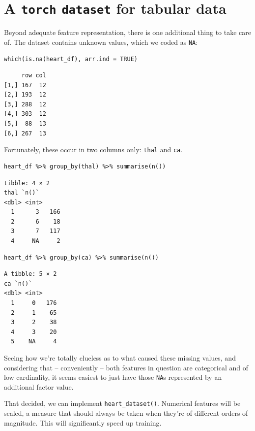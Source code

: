 \documentclass[
  letterpaper,
]{krantz}
\begin{document}
\hypertarget{a-torch-dataset-for-tabular-data}{%
\section{\texorpdfstring{A \texttt{torch} \texttt{dataset} for tabular
data}{A torch dataset for tabular data}}\label{a-torch-dataset-for-tabular-data}}

Beyond adequate feature representation, there is one additional thing to
take care of. The dataset contains unknown values, which we coded as
\texttt{NA}:

\begin{verbatim}
which(is.na(heart_df), arr.ind = TRUE)
\end{verbatim}

\begin{verbatim}
     row col
[1,] 167  12
[2,] 193  12
[3,] 288  12
[4,] 303  12
[5,]  88  13
[6,] 267  13
\end{verbatim}

Fortunately, these occur in two columns only: \texttt{thal} and
\texttt{ca}.

\begin{verbatim}
heart_df %>% group_by(thal) %>% summarise(n())
\end{verbatim}

\begin{verbatim}
tibble: 4 × 2
thal `n()`
<dbl> <int>
  1      3   166
  2      6    18
  3      7   117
  4     NA     2
\end{verbatim}

\begin{verbatim}
heart_df %>% group_by(ca) %>% summarise(n())
\end{verbatim}

\begin{verbatim}
A tibble: 5 × 2
ca `n()`
<dbl> <int>
  1     0   176
  2     1    65
  3     2    38
  4     3    20
  5    NA     4
\end{verbatim}

Seeing how we're totally clueless as to what caused these missing
values, and considering that -- conveniently -- both features in
question are categorical and of low cardinality, it seems easiest to
just have those \texttt{NA}s represented by an additional factor value.

That decided, we can implement \texttt{heart\_dataset()}. Numerical
features will be scaled, a measure that should always be taken when
they're of different orders of magnitude. This will significantly speed
up training.
\end{document}
